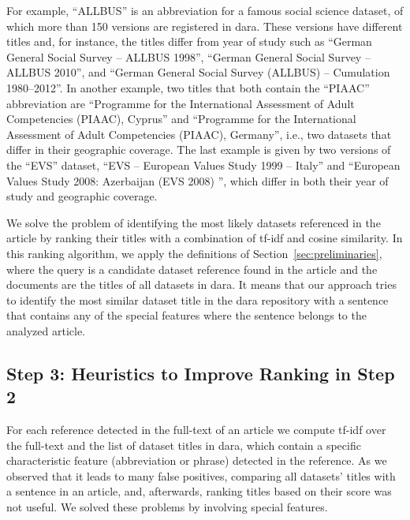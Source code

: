 \documentclass{IOS-Book-Article}
\newcommand{\dara}{\textsf{da\textbar ra}}
\begin{document}
For example, \enquote{ALLBUS} is an abbreviation for a famous social science dataset, of which more than 150 versions are registered in {\dara}.
These versions have different titles and, for instance, the titles differ from year of study such as \enquote{German General
Social Survey -- ALLBUS 1998}, 
\enquote{German General Social Survey -- ALLBUS 2010}, and \enquote{German General Social Survey (ALLBUS) -- Cumulation 1980--2012}.
In another example, two titles that both contain the \enquote{PIAAC} abbreviation are \enquote{Programme for the International Assessment of Adult Competencies (PIAAC), Cyprus} and \enquote{Programme for the International Assessment of Adult Competencies (PIAAC), Germany}, i.e., two datasets that differ in their geographic coverage.
The last example is given by two versions of the \enquote{EVS} dataset, 
\enquote{EVS -- European Values Study 1999 -- Italy} and \enquote{European Values Study 2008: Azerbaijan (EVS 2008) }, which differ in both their year of study and geographic coverage.

We solve the problem of identifying the most likely datasets referenced in the article by ranking their titles with a combination of tf-idf and cosine similarity.
In this ranking algorithm, we apply the definitions of Section~\ref{sec:preliminaries}, where the query is a candidate dataset reference found in the article and the documents are the titles of all datasets in {\dara}. 
It means that our approach tries to identify the most similar dataset title in the {\dara} repository with a sentence that contains any of the special features where the sentence belongs to the analyzed article.

\subsection{Step 3: Heuristics to Improve Ranking in Step 2}
\label{sec:heur-impr-rank}

For each reference detected in the full-text of an article we compute tf-idf over the full-text and the list of dataset titles in {\dara}, which contain a specific characteristic feature (abbreviation or phrase) detected in the reference.
As we observed that it leads to many false positives, comparing all datasets' titles with a sentence in an article, and, afterwards, ranking titles based on their score was not useful.
We solved these problems by involving special features.
\end{document}
